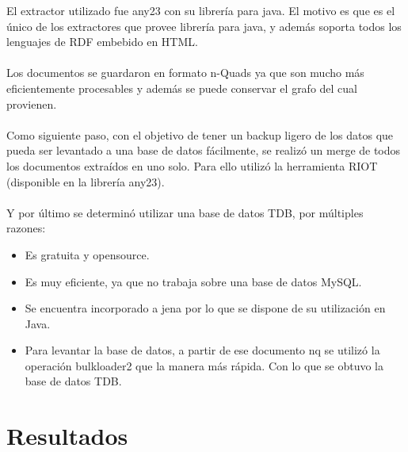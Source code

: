 \noindent El extractor utilizado fue any23 con su librería para java. El motivo es que es el único de los extractores que provee 
librería para java, y además soporta todos los lenguajes de RDF embebido en HTML.
\\\\
Los documentos se guardaron en formato n-Quads ya que son mucho más eficientemente procesables y además se puede conservar el grafo 
del cual provienen.
\\\\
Como siguiente paso, con el objetivo de tener un backup ligero de los datos que pueda ser levantado a una base de datos fácilmente, se realizó un merge de todos los documentos extraídos en uno solo.
Para ello utilizó la herramienta RIOT (disponible en la librería any23).
\\\\
Y por último se determinó utilizar una base de datos TDB, por múltiples razones:
\begin{itemize}
\item Es gratuita y opensource. 
\item Es muy eficiente, ya que no trabaja sobre una base de datos MySQL.
\item Se encuentra incorporado a jena por lo que se dispone de su utilización en Java.
\item Para levantar la base de datos, a partir de ese documento nq se utilizó la operación bulkloader2 que la manera más rápida. Con lo que se obtuvo la base de datos TDB.
\end{itemize}

\section{Resultados}

